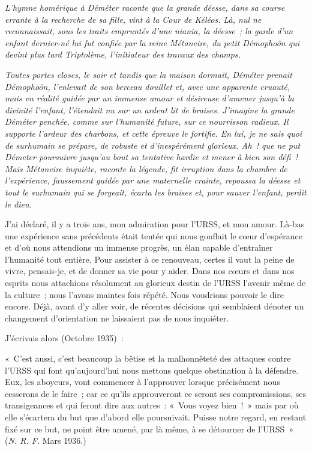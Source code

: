 \documentclass[french,twoside]{book} %
\newenvironment{quoteblock}%
  {\begin{quoting}}
  {\end{quoting}}
\newcommand\chaptercont{} %
\newenvironment{quotebar}{%
    \def\FrameCommand{{\color{rubric!10!}\vrule width 0.5em} \hspace{0.9em}}%
    \def\OuterFrameSep{0pt} %
    \MakeFramed {\advance\hsize-\width \FrameRestore}
  }%
  {%
    \endMakeFramed
  }
\renewenvironment{quoteblock}%
  {%
    \savenotes
    \setstretch{0.9}
    \begin{quotebar}
    \smallskip
  }
  {%
    \smallskip
    \end{quotebar}
    \spewnotes
  }
\begin{document}
\chaptercont
{\itshape \noindent L’hymne homérique à Déméter raconte que la grande déesse, dans sa course errante à la recherche de sa fille, vint à la Cour de Kéléos. Là, nul ne reconnaissait, sous les traits empruntés d’une niania, la déesse ; la garde d’un enfant dernier-né lui fut confiée par la reine Métaneire, du petit Démophoôn qui devint plus tard Triptolème, l’initiateur des travaux des champs.\par}
{\itshape Toutes portes closes, le soir et tandis que la maison dormait, Déméter prenait Démophoôn, l’enlevait de son berceau douillet et, avec une apparente cruauté, mais en réalité guidée par un immense amour et désireuse d’amener jusqu’à la divinité l’enfant, l’étendait nu sur un ardent lit de braises. J’imagine la grande Déméter penchée, comme sur l’humanité future, sur ce nourrisson radieux. Il supporte l’ardeur des charbons, et cette épreuve le fortifie. En lui, je ne sais quoi de surhumain se prépare, de robuste et d’inespérément glorieux. Ah ! que ne put Démeter poursuivre jusqu’au bout sa tentative hardie et mener à bien son défi ! Mais Métaneire inquiète, raconte la légende, fit irruption dans la chambre de l’expérience, faussement guidée par une maternelle crainte, repoussa la déesse et tout le surhumain qui se forgeait, écarta les braises et, pour sauver l’enfant, perdit le dieu.\par}
J’ai déclaré, il y a trois ans, mon admiration pour l’URSS, et mon amour. Là-bas une expérience sans précédents était tentée qui nous gonflait le cœur d’espérance et d’où nous attendions un immense progrès, un élan capable d’entraîner l’humanité tout entière. Pour assister à ce renouveau, certes il vaut la peine de vivre, pensais-je, et de donner sa vie pour y aider. Dans nos cœurs et dans nos esprits nous attachions résolument au glorieux destin de l’URSS l’avenir même de la culture ; nous l’avons maintes fois répété. Nous voudrions pouvoir le dire encore. Déjà, avant d’y aller voir, de récentes décisions qui semblaient dénoter un changement d’orientation ne laissaient pas de nous inquiéter.\par
J’écrivais alors (Octobre 1935) :\par

\begin{quoteblock}
 \noindent « C’est aussi, c’est beaucoup la bêtise et la malhonnêteté des attaques contre l’URSS qui font qu’aujourd’hui nous mettons quelque obstination à la défendre. Eux, les aboyeurs, vont commencer à l’approuver lorsque précisément nous cesserons de le faire ; car ce qu’ils approuveront ce seront ses compromissions, ses transigeances et qui feront dire aux autres : « Vous voyez bien ! » mais par où elle s’écartera du but que d’abord elle poursuivait. Puisse notre regard, en restant fixé sur ce but, ne point être amené, par là même, à se détourner de l’URSS » (\emph{N. R. F.} Mars 1936.)
\end{quoteblock}
\end{document}
